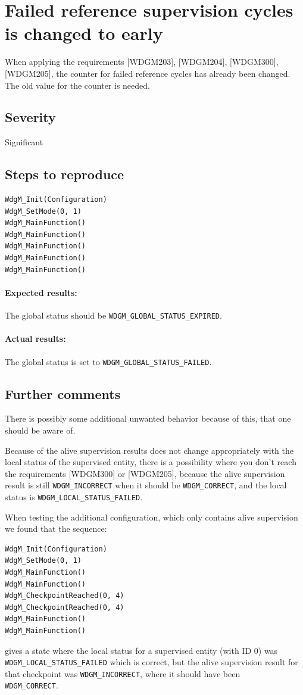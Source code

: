 \section{Failed reference supervision cycles is changed to early}
When applying the requirements [WDGM203], [WDGM204], [WDGM300], [WDGM205], the counter for failed reference cycles has already been
changed. The old value for the counter is needed.

\subsection{Severity}
Significant

\subsection{Steps to reproduce}
\begin{lstlisting}
WdgM_Init(Configuration)
WdgM_SetMode(0, 1)
WdgM_MainFunction()
WdgM_MainFunction()
WdgM_MainFunction()
WdgM_MainFunction()
WdgM_MainFunction()
\end{lstlisting}
\paragraph{Expected results:}
The global status should be \lstinline!WDGM_GLOBAL_STATUS_EXPIRED!.
\paragraph{Actual results:}
The global status is set to \lstinline!WDGM_GLOBAL_STATUS_FAILED!.

\subsection{Further comments}
There is possibly some additional unwanted behavior because of this,
that one should be aware of.

Because of the alive supervision results does not change appropriately
with the local status of the supervised entity, there is a possibility
where you don't reach the requirements [WDGM300] or [WDGM205], because
the alive supervision result is still \lstinline!WDGM_INCORRECT! when it should be
\lstinline!WDGM_CORRECT!, and the local status is \lstinline!WDGM_LOCAL_STATUS_FAILED!.

When testing the additional configuration, which only contains alive
supervision we found that the sequence:
\begin{lstlisting}
WdgM_Init(Configuration)
WdgM_SetMode(0, 1)
WdgM_MainFunction()
WdgM_MainFunction()
WdgM_CheckpointReached(0, 4)
WdgM_CheckpointReached(0, 4)
WdgM_MainFunction()
WdgM_MainFunction()
\end{lstlisting}
gives a state where the local status for a supervised entity (with ID
0) was\\\lstinline!WDGM_LOCAL_STATUS_FAILED! which is correct, but the alive
supervision result for that checkpoint was \lstinline!WDGM_INCORRECT!, where it
should have been\\\lstinline!WDGM_CORRECT!.

